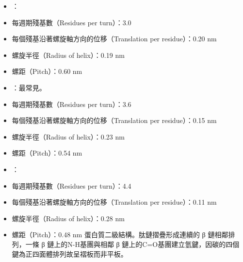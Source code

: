 \documentclass[a4paper,12pt]{report}
\begin{document}
\begin{itemize}
\begin{itemize}
\subsubsection{必須胺基酸（Essential amino acids）}
\begin{itemize}
\item {}：蛋白質胺基酸中人體無法自行合成者，共9種，分別是苯丙胺酸、纈胺酸、色胺酸、甲硫胺酸、異白胺酸、白胺酸、離胺酸、蘇胺酸、組胺酸。
\item {}：其餘11種蛋白質胺基酸。
\item {}：包含所有必需胺基酸的蛋白質。
\item {}：不是完整蛋白質的蛋白質。
\item 含有完整蛋白質的食物包括肉、魚、蛋、牛奶、大豆、藜麥、蕎麥等。穀物中的賴胺酸較少，大豆中的甲硫胺酸較少，可以互補。
\end{itemize}
指蛋白質局部殘基之間由C=O和N-H基團生成氫鍵形成的二級結構，會提升安定性與固定局部構形。
蛋白質二級結構。肽鏈呈螺旋狀，相鄰週期間形成氫鍵。對於L-胺基酸以右手螺旋為主，對於D-胺基酸以左手螺旋為主。
\bit
\item {}：
\bit
\item 每週期殘基數（Residues per turn）：3.0
\item 每個殘基沿著螺旋軸方向的位移（Translation per residue）：0.20 nm
\item 螺旋半徑（Radius of helix）：0.19 nm
\item 螺距（Pitch）：0.60 nm
\eit
\item {}：最常見。
\bit
\item 每週期殘基數（Residues per turn）：3.6
\item 每個殘基沿著螺旋軸方向的位移（Translation per residue）：0.15 nm
\item 螺旋半徑（Radius of helix）：0.23 nm
\item 螺距（Pitch）：0.54 nm
\eit
\item {}：
\bit
\item 每週期殘基數（Residues per turn）：4.4
\item 每個殘基沿著螺旋軸方向的位移（Translation per residue）：0.11 nm
\item 螺旋半徑（Radius of helix）：0.28 nm
\item 螺距（Pitch）：0.48 nm
\eit
\eit
{}
蛋白質二級結構。肽鏈摺疊形成連續的 β 鏈相鄰排列，一條 β 鏈上的N-H基團與相鄰 β 鏈上的C=O基團建立氫鍵，因碳的四個鍵為正四面體排列故呈褶板而非平板。

\end{itemize}
\end{itemize}
\end{document}
